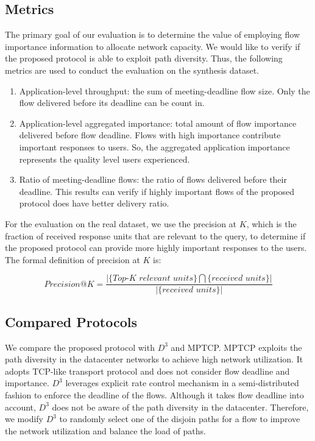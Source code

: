 \documentclass[conference]{IEEEtran}
\begin{document}
\subsection{Metrics}

The primary goal of our evaluation is to determine the value of employing flow importance information to allocate network capacity. We would like to verify if the proposed protocol is able to exploit path diversity. Thus, the following metrics are used to conduct the evaluation on the synthesis dataset.

\begin{enumerate}
\item Application-level throughput: the sum of meeting-deadline flow size. Only the flow delivered before its deadline can be count in.
\item Application-level aggregated importance: total amount of flow importance delivered before flow deadline. Flows with high importance contribute important responses to users. So, the aggregated application importance represents the quality level users experienced.
\item Ratio of meeting-deadline flows: the ratio of flows delivered before their deadline. This results can verify if highly important flows of the proposed protocol does have better delivery ratio.
\end{enumerate}

For the evaluation on the real dataset, we use the precision at $K$, which is the fraction of received response units that are relevant to the query, to determine if the proposed protocol can provide more highly important responses to the users. The formal definition of precision at $K$ is:

\begin{equation*}
 \textit{Precision@K}=\frac{|\{\textit{Top-K relevant units}\}\bigcap\{\textit{received units}\}|}{|\{\textit{received units}\}|}
 \label{eq:patk}
\end{equation*}

\subsection{Compared Protocols}

We compare the proposed protocol with $D^{3}$\cite{deadline} and MPTCP\cite{mptcp}. MPTCP exploits the path diversity in the datacenter networks to achieve high network utilization. It adopts TCP-like transport protocol and does not consider flow deadline and importance. $D^{3}$ leverages explicit rate control mechanism in a semi-distributed fashion to enforce the deadline of the flows. Although it takes flow deadline into account, $D^{3}$ does not be aware of the path diversity in the datacenter. Therefore, we modify $D^{3}$ to randomly select one of the disjoin paths for a flow to improve the network utilization and balance the load of paths.
\end{document}
